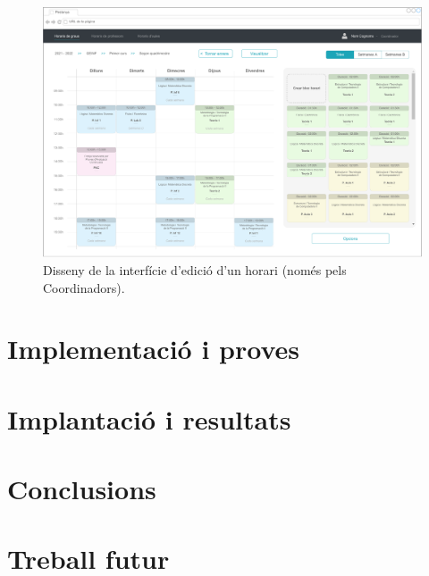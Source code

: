\documentclass[a4paper,12pt]{ThesisStyle}
\begin{document}
\begin{figure}[H]
  \centering
  \includegraphics[width=\textwidth]{assets/interfaces/coordinadors/horarisGraus/edicio.pdf}
  \caption{\label{img:horarisGraus_edicio}Disseny de la interfície d'edició d'un horari (només pels Coordinadors).}
\end{figure}


\chapter{Implementació i proves}
\label{cap:implementacio}





\chapter{Implantació i resultats}
\label{cap:implantacio}





\chapter{Conclusions}
\label{cap:conclusions}





\chapter{Treball futur}
\label{cap:treball_futur}
\end{document}
